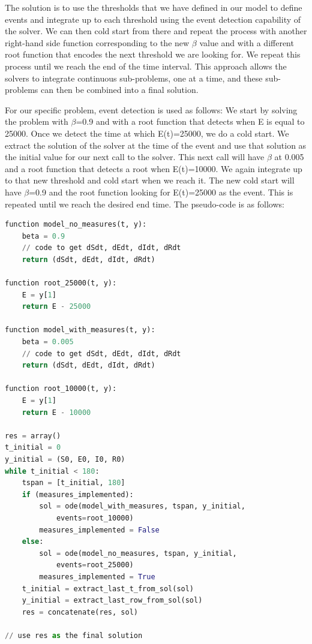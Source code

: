 The solution is to use the thresholds that we have defined in our model to define events and integrate up to each threshold using the event detection capability of the solver. We can then cold start from there and repeat the process with another right-hand side function corresponding to the new $\beta$ value and with a different root function that encodes the next threshold we are looking for. We repeat this process until we reach the end of the time interval. This approach allows the solvers to integrate continuous sub-problems, one at a time, and these sub-problems can then be combined into a final solution.

For our specific problem, event detection is used as follows:
We start by solving the problem with $\beta$=0.9 and with a root function that detects when E is equal to 25000. Once we detect the time at which E(t)=25000, we do a cold start. We extract the solution of the solver at the time of the event and use that solution as the initial value for our next call to the solver. This next call will have $\beta$ at 0.005 and a root function that detects a root when E(t)=10000. We again integrate up to that new threshold and cold start when we reach it. The new cold start will have $\beta$=0.9 and the root function looking for E(t)=25000 as the event. This is repeated until we reach the desired end time. The pseudo-code is as follows:

\begin{minipage}{\linewidth}
\centering
\begin{lstlisting}[language=Python]
function model_no_measures(t, y):
    beta = 0.9
    // code to get dSdt, dEdt, dIdt, dRdt
    return (dSdt, dEdt, dIdt, dRdt)

function root_25000(t, y):
    E = y[1]
    return E - 25000

function model_with_measures(t, y):
    beta = 0.005
    // code to get dSdt, dEdt, dIdt, dRdt
    return (dSdt, dEdt, dIdt, dRdt)

function root_10000(t, y):
    E = y[1]
    return E - 10000

res = array()
t_initial = 0
y_initial = (S0, E0, I0, R0)
while t_initial < 180:
    tspan = [t_initial, 180]
    if (measures_implemented):
        sol = ode(model_with_measures, tspan, y_initial,
            events=root_10000)
        measures_implemented = False
    else:
        sol = ode(model_no_measures, tspan, y_initial,
            events=root_25000)
        measures_implemented = True
    t_initial = extract_last_t_from_sol(sol)
    y_initial = extract_last_row_from_sol(sol)
    res = concatenate(res, sol)

// use res as the final solution
\end{lstlisting}
\end{minipage}

